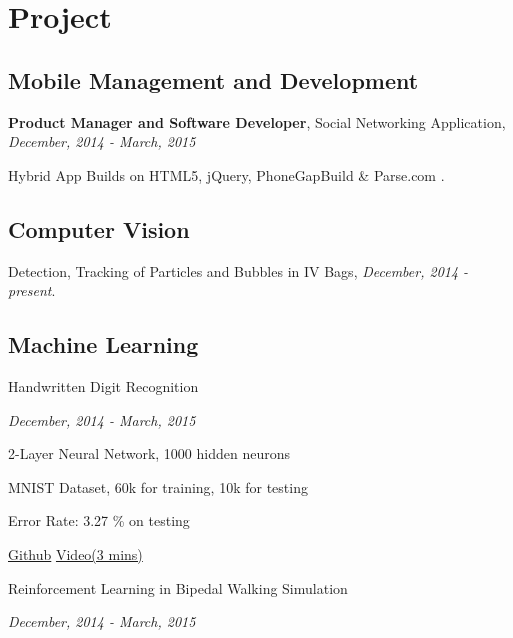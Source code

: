 \documentclass[letterpaper]{article}
\renewenvironment{itemize}{
  \begin{list}{}{
    \setlength{\leftmargin}{1.5em}
  }
}{
  \end{list}
}
\begin{document}
\section*{Project}

\subsection*{Mobile Management and Development}
\hspace{0.1in} \textbf{Product Manager and Software Developer}, Social Networking Application, {\it December, 2014 - March, 2015}
\vspace{0.05in}

\hspace{0.2in} Hybrid App Builds on HTML5, jQuery, PhoneGap\texttrademark Build \& Parse.com .
	

\subsection*{Computer Vision}
\begin{itemize}
	\item Detection, Tracking of Particles and Bubbles in IV Bags,
	{\it December, 2014 - present}.

	
\end{itemize}
\subsection*{Machine Learning}
\begin{multicols}{2}
\hspace{0.1in}Handwritten Digit Recognition 
\vspace{0.05in}

\hspace{0.2in} {\it December, 2014 - March, 2015}
\vspace{0.05in}

\hspace{0.2in} 2-Layer Neural Network, 1000 hidden neurons
\vspace{0.05in}

\hspace{0.2in} MNIST Dataset, 60k for training, 10k for testing
\vspace{0.05in}

\hspace{0.2in} Error Rate: 3.27 \% on testing
\vspace{0.05in}

\hspace{0.2in} \href{https://github.com/Yaliang/Handwritten}{\color[rgb]{0.2, 0.7, 0.7} Github} \hspace{0.1in} \href{https://drive.google.com/file/d/0B0flKXz1pWAcb2RIVU5SbUd0dkU/view}{\color[rgb]{0.2, 0.7, 0.7} Video(3 mins)}

\columnbreak
Reinforcement Learning in Bipedal Walking Simulation\vspace{0.05in}

\hspace{0.1in} {\it December, 2014 - March, 2015}
\end{multicols}
\end{document}

